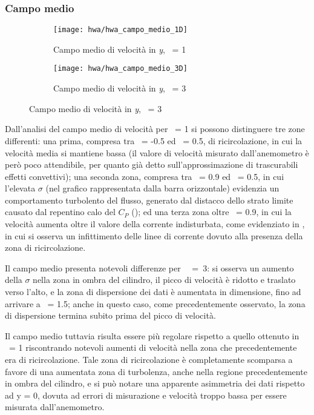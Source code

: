 \documentclass{article} %
\newcommand{\xd}{\nicefrac{\textrm{x}}{\textrm{D}}\ }
\newcommand{\yd}{\nicefrac{\textrm{y}}{\textrm{D}}\ }
\begin{document}
\subsubsection{Campo medio}
\begin{figure}[h!]
	\begin{subfigure}{0.5\textwidth}
		\texttt{[image: hwa/hwa\_campo\_medio\_1D]}
		\label{hwa_campo_medio_1D}
		\caption{Campo medio di velocità in \textit{y}, \xd = 1}
	\end{subfigure}
	\begin{subfigure}{0.5\textwidth}
		\texttt{[image: hwa/hwa\_campo\_medio\_3D]}
		\label{hwa_campo_medio_3D}
		\caption{Campo medio di velocità in \textit{y}, \xd = 3}
	\end{subfigure}
\end{figure}
\begin{minipage}[t]{0.5\textwidth}
	\centering
	\begin{minipage}[t]{0.95\textwidth} \onehalfspacing
		Dall'analisi del campo medio di velocità per \xd = 1 si possono distinguere tre zone differenti: una prima, compresa tra \yd = -0.5 ed \yd = 0.5, di ricircolazione, in cui la velocità media si mantiene bassa (il valore di velocità misurato dall'anemometro è però poco attendibile, per quanto già detto sull'approssimazione di trascurabili effetti convettivi); una seconda zona, compresa tra \yd = 0.9 ed \yd = 0.5, in cui l'elevata $\sigma$ (nel grafico rappresentata dalla barra orizzontale) evidenzia un comportamento turbolento del flusso, generato dal distacco dello strato limite causato dal repentino calo del $C_P$ (\cite[fig.~4]{roshko61}); ed una terza zona oltre \yd = 0.9, in cui la velocità aumenta oltre il valore della corrente indisturbata, come evidenziato in \cite[fig.~4a]{braza06}, in cui si osserva un infittimento delle linee di corrente dovuto alla presenza della zona di ricircolazione.
	\end{minipage}
\end{minipage}
\begin{minipage}[t]{0.5\textwidth}
	\centering
	\begin{minipage}[t]{0.95\textwidth} \onehalfspacing
		Il campo medio presenta notevoli differenze per \xd~=~3: si osserva un aumento della $\sigma$ nella zona in ombra del cilindro, il picco di velocità è ridotto e traslato verso l'alto, e la zona di dispersione dei dati è aumentata in dimensione, fino ad arrivare a \yd = 1.5; anche in questo caso, come precedentemente osservato, la zona di dispersione termina subito prima del picco di velocità.\par
		Il campo medio tuttavia risulta essere più regolare rispetto a quello ottenuto in \xd = 1 riscontrando notevoli aumenti di velocità nella zona che precedentemente era di ricircolazione. Tale zona di ricircolazione è completamente scomparsa a favore di una aumentata zona di turbolenza, anche nella regione precedentemente in ombra del cilindro, e si può notare una apparente asimmetria dei dati rispetto ad y = 0, dovuta ad errori di misurazione e velocità troppo bassa per essere misurata dall'anemometro.
	\end{minipage}
\end{minipage}
\newpage
\end{document}
